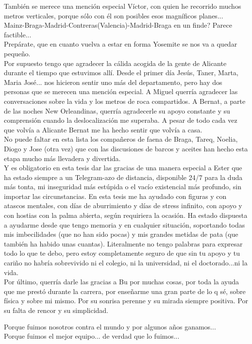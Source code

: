 También se merece una mención especial Víctor, con quien he recorrido muchos metros verticales, porque sólo con él son posibles esos magníficos planes...\\
Mainz-Braga-Madrid-Contreras(Valencia)-Madrid-Braga en un finde? Parece factible...\\
Prepárate, que en cuanto vuelva a estar en forma Yosemite se nos va a quedar pequeño.\\


Por supuesto tengo que agradecer la cálida acogida de la gente de Alicante durante el tiempo que estuvimos allí. Desde el primer día Jesús, Taner, Marta, Maria José... nos hicieron sentir uno más del departamento, pero hay dos personas que se merecen una mención especial. A Miguel querría agradecer las conversaciones sobre la vida y los metros de roca compartidos. A Bernat, a parte de las noches New Orleandinas, querría agradecerle su apoyo constante y su comprensión cuando la deslocalización me superaba. A pesar de todo cada vez que volvía a Alicante Bernat me ha hecho sentir que volvía a casa.\\

No puede faltar en esta lista los compañeros de faena de Braga, Tareq, Noelia, Diogo y Jose (otra vez) que con las discusiones de barcos y aceites han hecho esta etapa mucho más llevadera y divertida.\\


Y es obligatorio en esta tesis dar las gracias de una manera especial a Ester que ha estado siempre a un Telegram-azo de distancia, disponible 24/7 para la duda más tonta, mi inseguridad más estúpida o el vacío existencial más profundo, sin importar las circunstancias. En esta tesis me ha ayudado con figuras y con atascos mentales, con días de aburrimiento y días de stress infinito, con apoyo y con hostias con la palma abierta, según requiriera la ocasión.
Ha estado dispuesta a ayudarme desde que tengo memoria y en cualquier situación, soportando todas mis imbecilidades (que no han sido pocas) y mis grandes metidas de pata (que también ha habido unas cuantas).
Literalmente no tengo palabras para expresar todo lo que te debo, pero estoy completamente seguro de que sin tu apoyo y tu cariño no habría sobrevivido ni el colegio, ni la universidad, ni el doctorado...ni la vida.\\



Por último, querría darle las gracias a Bu por muchas cosas, por toda la ayuda que me prestó durante la carrera, por enseñarme una gran parte de lo q sé, sobre física y sobre mi mismo. Por su sonrisa perenne y su mirada siempre positiva. Por su falta de rencor y su simplicidad.






Porque fuimos nosotros contra el mundo y por algunos años ganamos...\\
Porque fuimos el mejor equipo... de verdad que lo fuimos...
